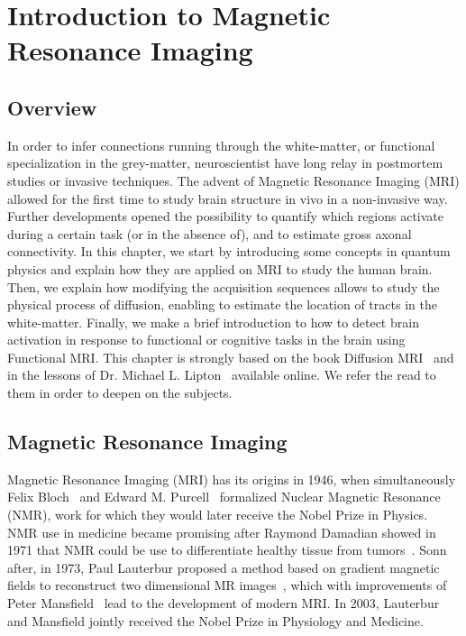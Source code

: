 \chapter{Introduction to Magnetic Resonance Imaging}
\label{ch:intro_mri}

\section{Overview}
In order to infer connections running through the white-matter, or functional
specialization in the grey-matter, neuroscientist have long relay in postmortem
studies or invasive techniques. The advent of Magnetic Resonance Imaging (MRI)
allowed for the first time to study brain structure in vivo in a non-invasive
way. Further developments opened the possibility to quantify which regions
activate during a certain task (or in the absence of), and to estimate gross
axonal connectivity. In this chapter, we start by
introducing some concepts in quantum physics and explain how they are
applied on MRI to study the human brain. Then, we explain how modifying the
acquisition sequences allows to study the physical process of diffusion,
enabling to estimate the location of tracts in the white-matter. Finally, we
make a brief introduction to how to detect brain activation in response to
functional or cognitive tasks in the brain using Functional MRI. This chapter
is strongly based on the book Diffusion MRI~ \cite{Basser2009} and in the 
lessons of Dr. Michael L. Lipton~\cite{Lipton2014} available online. We refer
the read to them in order to deepen on the subjects.


\section{Magnetic Resonance Imaging}

Magnetic Resonance Imaging (MRI) has its origins in 1946, when simultaneously Felix
Bloch~\cite{Bloch1946} and Edward M. Purcell~\cite{Purcell1946} formalized
Nuclear Magnetic Resonance (NMR), work for which they would later receive the
Nobel Prize in Physics. NMR use in medicine became promising after
Raymond Damadian showed in 1971 that NMR could be use to differentiate healthy
tissue from tumors~\cite{Reichson1971}. Sonn after, in 1973, Paul Lauterbur 
proposed a method based on gradient magnetic fields to reconstruct two dimensional
MR images~\cite{Lauterbur1973}, which with improvements of Peter
Mansfield~\cite{Mansfield1977} lead to the development of modern MRI. In 2003,
Lauterbur and Mansfield jointly received the Nobel Prize in Physiology and
Medicine. 

